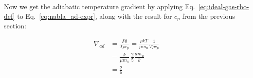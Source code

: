 \documentclass[11pt,twocolumn]{article}
\begin{document}
\begin{appendices}
Now we get the adiabatic temperature gradient by applying Eq.~\eqref{eq:ideal-gas-rho-def} to Eq.~\eqref{eq:nabla_ad-expr}, along with the result for $c_p$ from the previous section:

\begin{align*}
    \nabla_{ad} &= \frac{P\delta}{T\rho c_p} = \frac{\rho kT}{\mu m_u} \frac{1}{T\rho c_p}\\
    &= \frac{k}{\mu m_u} \, \frac{2}{5}\frac{\mu m_u}{k} \\&= \frac{2}{5}
\end{align*}


\end{appendices}

\printbibliography
\end{document}
